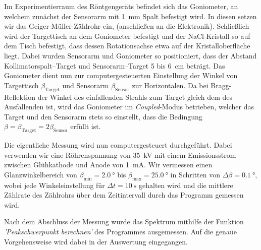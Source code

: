 \documentclass[11pt, a4paper]{article}
\begin{document}
Im Experimentierraum des Röntgengeräts befindet sich das Goniometer, an welchem zunächst der Sensorarm mit \SI{1}{\milli\metre} Spalt befestigt wird.
In diesen setzen wir das Geiger-Müller-Zählrohr ein, (anschließen an die Elektronik).
Schließlich wird der Targettisch an dem Goniometer befestigt und der NaCl-Kristall so auf dem Tisch befestigt, dass dessen Rotationsachse etwa auf der Kristalloberfläche liegt.
Dabei wurden Sensorarm und Goniometer so positioniert, dass der Abstand Kollimatorspalt--Target und Sensorarm--Target \num{5} bis \SI{6}{\centi\metre} beträgt.
Das Goniometer dient nun zur computergesteuerten Einstellung der Winkel von Targettisch $\beta_\mathrm{Target}$ und Sensorarm $\beta_\mathrm{Sensor}$ zur Horizontalen.
Da bei Bragg-Reflektion der Winkel des einfallenden Strahls zum Target gleich dem des Ausfallenden ist, wird das Goniometer im \emph{Coupled}-Modus betrieben, welcher das Target und den Sensorarm stets so einstellt, dass die Bedingung $\beta = \beta_\mathrm{Target} = 2\beta_\mathrm{Sensor}$ erfüllt ist.

Die eigentliche Messung wird nun computergesteuert durchgeführt.
Dabei verwenden wir eine Röhrenspannung von \SI{35}{\kilo\volt} mit einem Emissionsstrom zwischen Glühkathode und Anode von \SI{1}{\milli\ampere}.
Wir vermessen einen Glanzwinkelbereich von $\beta_\mathrm{min} = \SI{2,0}{\degree}$ bis $\beta_\mathrm{max} = \SI{25,0}{\degree}$ in Schritten von $\Delta \beta = \SI{0,1}{\degree}$, wobei jede Winkeleinstellung für $\Delta t = \SI{10}{\second}$ gehalten wird und die mittlere Zählrate des Zählrohrs über dem Zeitintervall durch das Programm gemessen wird.

Nach dem Abschluss der Messung wurde das Spektrum mithilfe der Funktion \emph{'Peakschwerpunkt berechnen'} des Programmes ausgemessen. Auf die genaue Vorgehensweise wird dabei in der Auswertung eingegangen.
\end{document}
